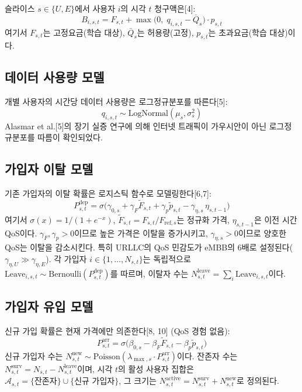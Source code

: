 \documentclass[10pt, twocolumn]{article}
\begin{document}
슬라이스 $s \in \{U, E\}$에서 사용자 $i$의 시각 $t$ 청구액은[4]:
\begin{equation}
  B_{i,s,t} = F_{s,t} + \max\!\big(0,\; q_{i,s,t} - \bar{Q}_s\big) \cdot p_{s,t}
  \label{eq:bill}
\end{equation}
여기서 $F_{s,t}$는 고정요금(학습 대상), $\bar{Q}_s$는 허용량(고정), $p_{s,t}$는 초과요금(학습 대상)이다.

\subsection{데이터 사용량 모델}

개별 사용자의 시간당 데이터 사용량은 로그정규분포를 따른다[5]:
\begin{equation}
  q_{i,s,t} \sim \text{LogNormal}(\mu_s, \sigma_s^2)
  \label{eq:usage}
\end{equation}
Alasmar et al.[5]의 장기 실증 연구에 의해 인터넷 트래픽이 가우시안이 아닌 로그정규분포를 따름이 확인되었다.

\subsection{가입자 이탈 모델}

기존 가입자의 이탈 확률은 로지스틱 함수로 모델링한다[6,7]:
\begin{equation}
  P_{s,t}^{\text{dep}} = \sigma\!\Big(\gamma_{0,s} + \gamma_F \tilde{F}_{s,t} + \gamma_p \tilde{p}_{s,t} - \gamma_{\eta,s}\, \eta_{s,t-1}\Big)
  \label{eq:depart}
\end{equation}
여기서 $\sigma(x) = 1/(1+e^{-x})$, $\tilde{F}_{s,t} = F_{s,t}/F_{\text{ref},s}$는 정규화 가격, $\eta_{s,t-1}$은 이전 시간 QoS이다. $\gamma_F, \gamma_p > 0$이므로 높은 가격은 이탈을 증가시키고, $\gamma_{\eta,s} > 0$이므로 양호한 QoS는 이탈을 감소시킨다. 특히 URLLC의 QoS 민감도가 eMBB의 6배로 설정된다($\gamma_{\eta,U} \gg \gamma_{\eta,E}$). 각 가입자 $i \in \{1, \ldots, N_{s,t}\}$는 독립적으로 $\text{Leave}_{i,s,t} \sim \text{Bernoulli}(P_{s,t}^{\text{dep}})$를 따르며, 이탈자 수는 $N_{s,t}^{\text{leave}} = \sum_i \text{Leave}_{i,s,t}$이다.

\subsection{가입자 유입 모델}

신규 가입 확률은 현재 가격에만 의존한다[8, 10] (QoS 경험 없음):
\begin{equation}
  P_{s,t}^{\text{arr}} = \sigma\!\Big(\beta_{0,s} - \beta_F \tilde{F}_{s,t} - \beta_p \tilde{p}_{s,t}\Big)
  \label{eq:arrive}
\end{equation}
신규 가입자 수는 $N_{s,t}^{\text{new}} \sim \text{Poisson}(\lambda_{\max,s} \cdot P_{s,t}^{\text{arr}})$이다. 잔존자 수는 $N_{s,t}^{\text{surv}} = N_{s,t} - N_{s,t}^{\text{leave}}$이며, 시각 $t$의 활성 사용자 집합은 $\mathcal{A}_{s,t} = \{\text{잔존자}\} \cup \{\text{신규 가입자}\}$, 그 크기는 $N_{s,t}^{\text{active}} = N_{s,t}^{\text{surv}} + N_{s,t}^{\text{new}}$로 정의된다.
\end{document}
